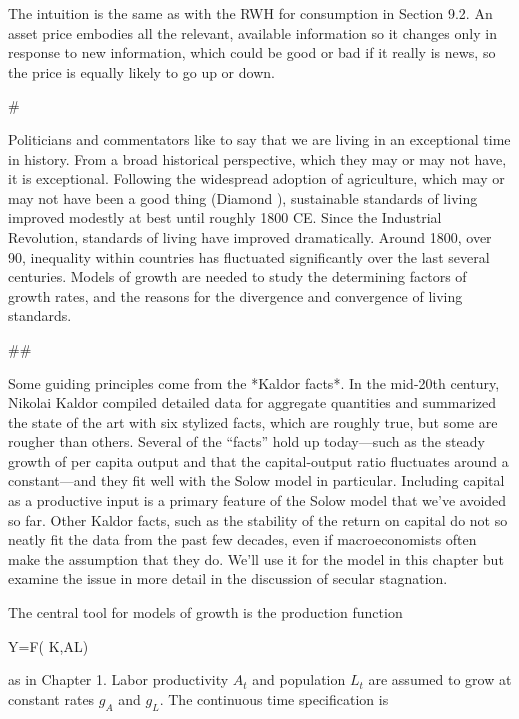 ﻿\documentclass[oneside]{book}
\begin{document}
The intuition is the same as with the RWH for consumption in Section 9.2.
An asset price embodies all the relevant, available information so it
changes only in response to new information, which could be good or bad if
it really is news, so the price is equally likely to go up or down.



#



Politicians and commentators like to say that we are living in an exceptional
time in history. From a broad historical perspective, which they may or
may not have, it is exceptional. Following the widespread adoption of agriculture, which may or may not have been a good thing
(Diamond ), sustainable standards of living improved modestly at best until roughly 1800 CE. Since the Industrial Revolution, standards of living have improved dramatically. Around 1800, over 90\Furthermore, inequality within countries has fluctuated significantly over the last several centuries. Models of growth are needed to study the determining factors of growth rates, and the reasons for the
divergence and convergence of living standards.



##



Some guiding principles come from the *Kaldor facts*. In the mid-20th century, Nikolai Kaldor
compiled detailed data for aggregate quantities and summarized the state of the art with six stylized facts, which are roughly true, but
some are rougher than others. Several of the ``facts'' hold up today---such as the steady growth of per capita output and that the capital-output ratio fluctuates around a constant---and they fit well with the Solow model in particular. Including capital as a productive input is a primary feature
of the Solow model that we've avoided so far. Other Kaldor facts, such as the stability of the return on capital do not so neatly fit the data from the past few decades, even if macroeconomists often make the assumption that they do. We'll use it for the model in this chapter but examine the issue in more detail in the discussion of secular stagnation.

The central tool for models of growth is the production function



Y=F( K,AL)


as in Chapter 1. Labor productivity $A_{t}$ and population $L_{t}$ are
assumed to grow at constant rates $g_{A}$ and $g_{L}.$ The continuous time
specification is
\end{document}
